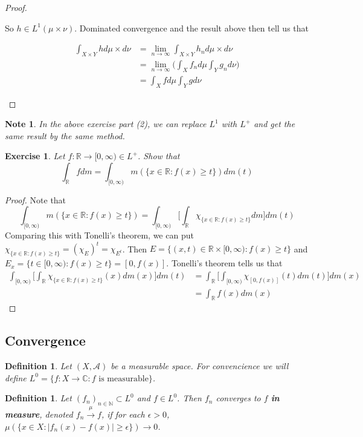 \documentclass[12pt]{amsart}
\newtheorem{defn}[thm]{Definition}
\newtheorem{note}[thm]{Note}
\newtheorem{ex}[thm]{Exercise}
\newcommand{\ep}{\epsilon}
\newcommand{\C}{\mathbb{C}}
\newcommand{\N}{\mathbb{N}}
\newcommand{\R}{\mathbb{R}}
\newcommand{\MA}{\mathcal{A}}
\newcommand{\Rg}{[0,\infty)}
\newcommand{\limn}{\lim \limits_{n \rightarrow \infty}}
\begin{document}
\begin{proof}
\begin{enumerate}
		So $h \in L^1(\mu \times \nu)$. Dominated convergence and the result above then tell us that 
		
		\begin{align*}
			\int_{X \times Y} h d\mu \times d\nu 
			&= \limn \int_{X \times Y} h_n d\mu \times d\nu \\
			&= \limn \bigg( \int_X f_n d\mu \int_Y g_n d\nu \bigg)\\
			&= \int_X f d\mu \int_Y g d\nu
		\end{align*}
		
	\end{enumerate}
\end{proof}

\begin{note}
	In the above exercise part (2), we can replace $L^1$ with $L^+$ and get the same result by the same method.
\end{note}

\begin{ex}
	Let $f:\R \rightarrow \Rg \in L^+$. Show that $$\int_{\R}fdm = \int_{\Rg}m(\{x \in \R: f(x) \geq t\}) dm(t)$$
\end{ex}

\begin{proof}
	Note that $$\int_{\Rg}m(\{x \in \R: f(x) \geq t\}) = \int_{\Rg} \bigg[\int_{\R} \chi_{\{x \in \R: f(x) \geq t\}}dm \bigg]dm(t)$$
	Comparing this with Tonelli's theorem, we can put $\chi_{\{x \in \R: f(x) \geq t\}} = (\chi_{E})^t = \chi_{E^t}$. Then $E = \{(x,t) \in \R \times \Rg: f(x) \geq t\}$ and $E_x = \{t \in \Rg: f(x) \geq t\} = [0,f(x)]$. Tonelli's theorem tells us that 
	\begin{align*}
		\int_{\Rg} \bigg[\int_{\R} \chi_{\{x \in \R: f(x) \geq t\}}(x) dm(x) \bigg]dm(t)
		&= \int_{\R} \bigg[ \int_{\Rg} \chi_{[0,f(x)]}(t) dm(t) \bigg] dm(x)\\
		&= \int_{\R} f(x) dm(x)
	\end{align*} 
\end{proof}

\subsection{Convergence}

\begin{defn}
	Let $(X, \MA)$ be a measurable space. For convencience we will define $L^0 = \{f:X \rightarrow \C: f \text{ is measurable}\}$.
\end{defn}

\begin{defn}
	Let $(f_n)_{n \in \N} \subset L^0$ and $f \in L^0$. Then $f_n$ converges to $f$ \textbf{in measure}, denoted $f_n \xrightarrow{\mu} f$, if for each $\ep > 0$, $\mu(\{x \in X: |f_n(x) - f(x)| \geq \ep \}) \rightarrow 0$.
\end{defn}
\end{document}
